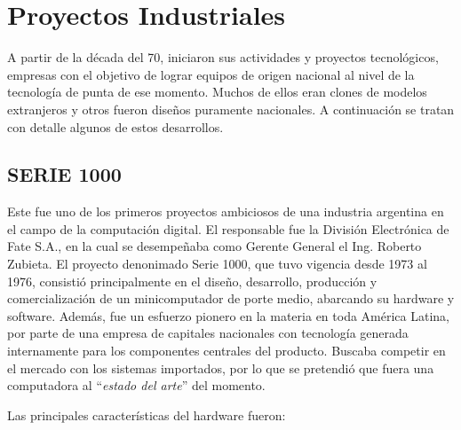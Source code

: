 \documentclass[%
  	final,
%
	notitlepage,
	narroweqnarray,
	inline,
 	twoside,
	]{ieee}
\begin{document}
\section{Proyectos Industriales}

A partir de la d\'ecada del 70, iniciaron sus actividades y proyectos tecnol\'ogicos, empresas con el objetivo de lograr equipos de origen nacional al nivel de la tecnolog\'ia de punta de ese momento. Muchos de ellos eran clones de modelos extranjeros y otros fueron dise\~nos puramente nacionales.
A continuaci\'on se tratan con detalle algunos de estos desarrollos.

\subsection*{SERIE 1000}

Este fue uno de los primeros proyectos ambiciosos de una industria argentina en el campo de la computaci\'on digital. El responsable fue la Divisi\'on Electr\'onica de Fate S.A., en la cual se desempe\~naba como Gerente General el Ing. Roberto Zubieta.
El proyecto denonimado Serie 1000, que tuvo vigencia desde 1973 al 1976, consisti\'o principalmente en el dise\~no, desarrollo, producci\'on y comercializaci\'on de un minicomputador de porte medio, abarcando su hardware y software. Adem\'as, fue un esfuerzo pionero en la materia en toda Am\'erica Latina, por parte de una empresa de capitales nacionales con tecnolog\'ia generada internamente para los componentes centrales del producto. Buscaba competir en el mercado con los sistemas importados, por lo que se pretendi\'o que fuera una computadora al ``\textit{estado del arte}'' del momento.

Las principales caracter\'isticas del hardware fueron:\\
\end{document}

